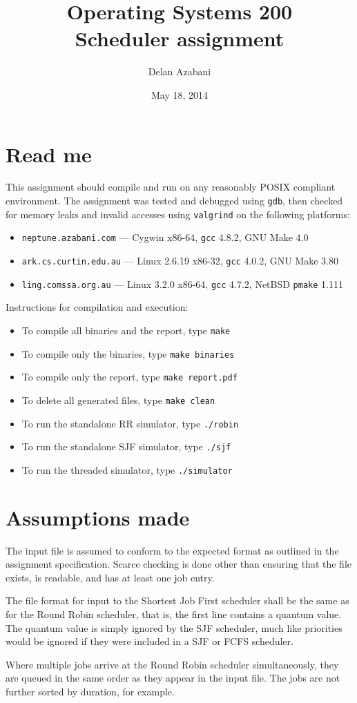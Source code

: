 \documentclass[a4paper,12pt]{article}
\title{Operating Systems 200\\Scheduler assignment}
\date{May 18, 2014}
\author{Delan Azabani}
\begin{document}
\maketitle

\section{Read me}

This assignment should compile and run on any reasonably POSIX compliant
environment. The assignment was tested and debugged using \texttt{gdb}, then
checked for memory leaks and invalid accesses using \texttt{valgrind} on the
following platforms:

\begin{itemize}
	\item \texttt{neptune.azabani.com} ---
	      Cygwin x86-64,
	      \texttt{gcc} 4.8.2,
	      GNU Make 4.0
	\item \texttt{ark.cs.curtin.edu.au} ---
	      Linux 2.6.19 x86-32,
	      \texttt{gcc} 4.0.2,
	      GNU Make 3.80
	\item \texttt{ling.comssa.org.au} ---
	      Linux 3.2.0 x86-64,
	      \texttt{gcc} 4.7.2,
	      NetBSD \texttt{pmake} 1.111
\end{itemize}

Instructions for compilation and execution:

\begin{itemize}
	\item To compile all binaries and the report, type \texttt{make}
	\item To compile only the binaries, type \texttt{make binaries}
	\item To compile only the report, type \texttt{make report.pdf}
	\item To delete all generated files, type \texttt{make clean}
	\item To run the standalone RR simulator, type \texttt{./robin}
	\item To run the standalone SJF simulator, type \texttt{./sjf}
	\item To run the threaded simulator, type \texttt{./simulator}
\end{itemize}

\section{Assumptions made}

The input file is assumed to conform to the expected format as outlined in the
assignment specification. Scarce checking is done other than ensuring that the
file exists, is readable, and has at least one job entry.

The file format for input to the Shortest Job First scheduler shall be the same
as for the Round Robin scheduler, that is, the first line contains a quantum
value. The quantum value is simply ignored by the SJF scheduler, much like
priorities would be ignored if they were included in a SJF or FCFS scheduler.

Where multiple jobs arrive at the Round Robin scheduler simultaneously, they
are queued in the same order as they appear in the input file. The jobs are not
further sorted by duration, for example.
\end{document}
